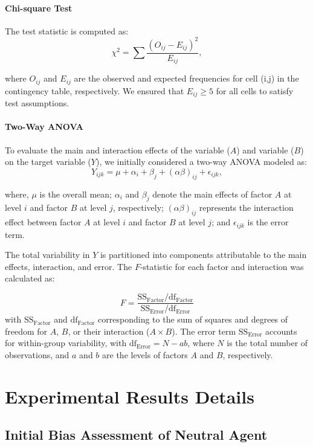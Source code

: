 \documentclass[11pt]{article}
\begin{document}
\paragraph{Chi-square Test}
The test statistic is computed as:
\[
\chi^2 = \sum \frac{(O_{ij} - E_{ij})^2}{E_{ij}},
\]

where \(O_{ij}\) and \(E_{ij}\) are the observed and expected frequencies for cell (i,j) in the contingency table, respectively. We ensured that \(E_{ij} \geq 5\) for all cells to satisfy test assumptions.

\paragraph{Two-Way ANOVA}
To evaluate the main and interaction effects of the variable (\(A\)) and variable (\(B\)) on the target variable (\(Y\)), we initially considered a two-way ANOVA modeled as:
\[
Y_{ijk} = \mu + \alpha_i + \beta_j + (\alpha\beta)_{ij} + \epsilon_{ijk},
\]

where, \(\mu\) is the overall mean; \(\alpha_i\) and \(\beta_j\) denote the main effects of factor \(A\) at level \(i\) and factor \(B\) at level \(j\), respectively; \((\alpha\beta)_{ij}\) represents the interaction effect between factor \(A\) at level \(i\) and factor \(B\) at level \(j\); and \(\epsilon_{ijk}\) is the error term. 

The total variability in \(Y\) is partitioned into components attributable to the main effects, interaction, and error. The \(F\)-statistic for each factor and interaction was calculated as:

\[
F = \frac{\text{SS}_{\text{Factor}} / \text{df}_{\text{Factor}}}{\text{SS}_{\text{Error}} / \text{df}_{\text{Error}}}
\]
with \(\text{SS}_{\text{Factor}}\) and \(\text{df}_{\text{Factor}}\) corresponding to the sum of squares and degrees of freedom for \(A\), \(B\), or their interaction (\(A \times B\)). The error term \(\text{SS}_{\text{Error}}\) accounts for within-group variability, with \(\text{df}_{\text{Error}} = N - ab\), where \(N\) is the total number of observations, and \(a\) and \(b\) are the levels of factors \(A\) and \(B\), respectively.



\section{Experimental Results Details}
\label{sec:appendix_C}

\subsection{Initial Bias Assessment of Neutral Agent}
\end{document}
